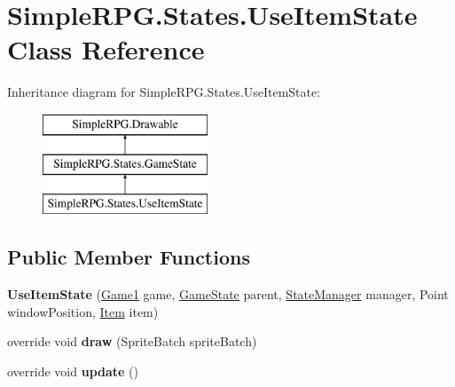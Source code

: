 \hypertarget{class_simple_r_p_g_1_1_states_1_1_use_item_state}{\section{Simple\+R\+P\+G.\+States.\+Use\+Item\+State Class Reference}
\label{class_simple_r_p_g_1_1_states_1_1_use_item_state}
}
Inheritance diagram for Simple\+R\+P\+G.\+States.\+Use\+Item\+State\+:\begin{figure}[H]
\begin{center}
\leavevmode
\includegraphics[height=3.000000cm]{class_simple_r_p_g_1_1_states_1_1_use_item_state}
\end{center}
\end{figure}
\subsection*{Public Member Functions}
\begin{DoxyCompactItemize}
\item 
\hypertarget{class_simple_r_p_g_1_1_states_1_1_use_item_state_a11bf3becbf4d48248e00d04c6d44d467}{{\bfseries Use\+Item\+State} (\hyperlink{class_simple_r_p_g_1_1_game1}{Game1} game, \hyperlink{class_simple_r_p_g_1_1_states_1_1_game_state}{Game\+State} parent, \hyperlink{class_simple_r_p_g_1_1_states_1_1_state_manager}{State\+Manager} manager, Point window\+Position, \hyperlink{class_simple_r_p_g_1_1_item}{Item} item)}\label{class_simple_r_p_g_1_1_states_1_1_use_item_state_a11bf3becbf4d48248e00d04c6d44d467}

\item 
\hypertarget{class_simple_r_p_g_1_1_states_1_1_use_item_state_a5d99e92a08bc1407c045e1e5ab37f8b6}{override void {\bfseries draw} (Sprite\+Batch sprite\+Batch)}\label{class_simple_r_p_g_1_1_states_1_1_use_item_state_a5d99e92a08bc1407c045e1e5ab37f8b6}

\item 
\hypertarget{class_simple_r_p_g_1_1_states_1_1_use_item_state_ad385afabb54275c9163ae4a9f69c8145}{override void {\bfseries update} ()}\label{class_simple_r_p_g_1_1_states_1_1_use_item_state_ad385afabb54275c9163ae4a9f69c8145}

\end{DoxyCompactItemize}
